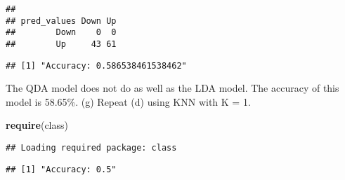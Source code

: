 \documentclass[]{article}
\newenvironment{Shaded}{\begin{snugshade}}{\end{snugshade}}
\newcommand{\KeywordTok}[1]{\textcolor[rgb]{0.13,0.29,0.53}{\textbf{{#1}}}}
\newcommand{\DataTypeTok}[1]{\textcolor[rgb]{0.13,0.29,0.53}{{#1}}}
\newcommand{\DecValTok}[1]{\textcolor[rgb]{0.00,0.00,0.81}{{#1}}}
\newcommand{\StringTok}[1]{\textcolor[rgb]{0.31,0.60,0.02}{{#1}}}
\newcommand{\NormalTok}[1]{{#1}}
\begin{document}
\begin{verbatim}
##            
## pred_values Down Up
##        Down    0  0
##        Up     43 61
\end{verbatim}

\begin{Shaded}
\end{Shaded}

\begin{verbatim}
## [1] "Accuracy: 0.586538461538462"
\end{verbatim}

The QDA model does not do as well as the LDA model. The accuracy of this
model is 58.65\%. (g) Repeat (d) using KNN with K = 1.

\begin{Shaded}
\begin{Highlighting}[]
\KeywordTok{require}\NormalTok{(class)}
\end{Highlighting}
\end{Shaded}

\begin{verbatim}
## Loading required package: class
\end{verbatim}

\begin{Shaded}
\end{Shaded}

\begin{verbatim}
## [1] "Accuracy: 0.5"
\end{verbatim}
\end{document}
